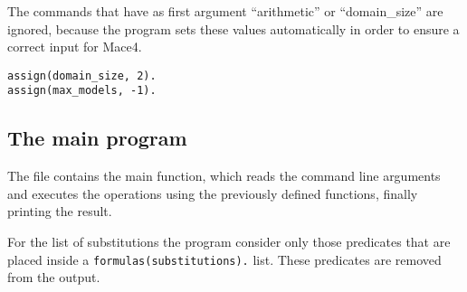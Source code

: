 The commands that have as first argument ``arithmetic'' or ``domain\_size'' are ignored, because the program sets these values automatically in order to ensure a correct input for Mace4.

\begin{lstlisting}[numbers=none,caption=The commands that are automatically inserted by the program]
assign(domain_size, 2).
assign(max_models, -1).
\end{lstlisting}





\subsection{The main program}

The  file contains the main function, which reads the command line arguments and executes the operations using the previously defined functions, finally printing the result.

For the list of substitutions the program consider only those predicates that are placed inside a \verb|formulas(substitutions).| list. These predicates are removed from the output.
